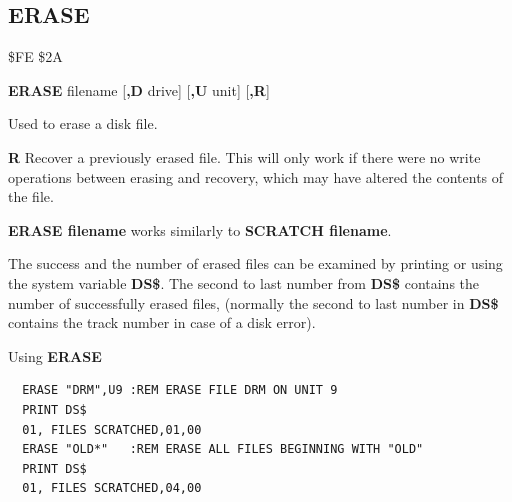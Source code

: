 \subsection{ERASE}
\label{erasecommand}
\begin{description}[leftmargin=2cm,style=nextline]
\item [Token:] \$FE \$2A
\item [Format:] {\bf ERASE} filename [{\bf,D} drive] [{\bf,U} unit] [{\bf,R}]
\item [Usage:] Used
               to erase a disk file.

   \filenamedefinition

   \drivedefinition

   \unitdefinition

   {\bf R} Recover a previously erased file.
   This will only work if there were no write operations
   between erasing and recovery, which may have altered the
   contents of the file.

\item [Remarks:] {\bf ERASE filename} works similarly to {\bf SCRATCH filename}.

                 The success and the number of erased files can
                 be examined by printing or using the system
                 variable {\bf DS\$}. The second to last number from {\bf DS\$}
                 contains the number of successfully erased files,
                 (normally the second to last number in {\bf DS\$}
                 contains the track number in case of a disk error).

\item [Examples:] Using {\bf ERASE}
\begin{tcolorbox}[colback=black,coltext=white]
\verbatimfont{\codefont}
\begin{verbatim}
  ERASE "DRM",U9 :REM ERASE FILE DRM ON UNIT 9
  PRINT DS$
  01, FILES SCRATCHED,01,00
  ERASE "OLD*"   :REM ERASE ALL FILES BEGINNING WITH "OLD"
  PRINT DS$
  01, FILES SCRATCHED,04,00
\end{verbatim}
\end{tcolorbox}
\end{description}


\newpage
